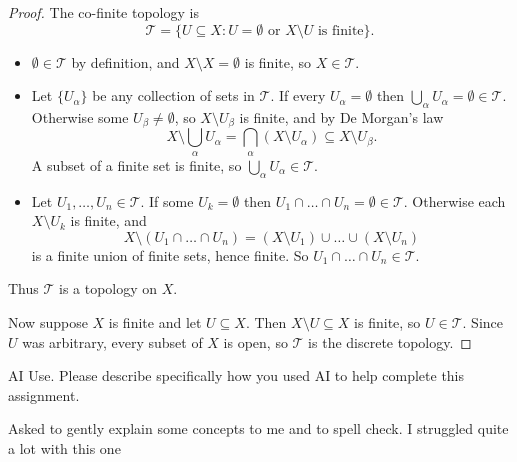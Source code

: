 \documentclass[minion]{homework}
\begin{document}
\begin{problems}
\begin{proof}
  The co-finite topology is
  $$\mathcal{T} = \{U \subseteq X : U = \emptyset \text{ or } X \setminus U \text{ is finite}\}.$$
  \begin{itemize}
    \item[(T1)] $\emptyset \in \mathcal{T}$ by definition, and $X \setminus X = \emptyset$ is finite, so $X \in \mathcal{T}$.
    \item[(T2)] Let $\{U_\alpha\}$ be any collection of sets in $\mathcal{T}$. If every $U_\alpha = \emptyset$ then $\bigcup_\alpha U_\alpha = \emptyset \in \mathcal{T}$. Otherwise some $U_\beta \neq \emptyset$, so $X \setminus U_\beta$ is finite, and by De Morgan's law
      $$X \setminus \bigcup_\alpha U_\alpha = \bigcap_\alpha (X \setminus U_\alpha) \subseteq X \setminus U_\beta.$$
      A subset of a finite set is finite, so $\bigcup_\alpha U_\alpha \in \mathcal{T}$.
    \item[(T3)] Let $U_1, \dots, U_n \in \mathcal{T}$. If some $U_k = \emptyset$ then $U_1 \cap \dots \cap U_n = \emptyset \in \mathcal{T}$. Otherwise each $X \setminus U_k$ is finite, and
      $$X \setminus (U_1 \cap \dots \cap U_n) = (X \setminus U_1) \cup \dots \cup (X \setminus U_n)$$
      is a finite union of finite sets, hence finite. So $U_1 \cap \dots \cap U_n \in \mathcal{T}$.
  \end{itemize}
  Thus $\mathcal{T}$ is a topology on $X$.

  Now suppose $X$ is finite and let $U \subseteq X$. Then $X \setminus U \subseteq X$ is finite, so $U \in \mathcal{T}$. Since $U$ was arbitrary, every subset of $X$ is open, so $\mathcal{T}$ is the discrete topology.
\end{proof}

\problem AI Use. Please describe specifically how you used AI to help complete this assignment.

Asked to gently explain some concepts to me and to spell check. I struggled quite a lot with this one
\end{problems}
\end{document}
